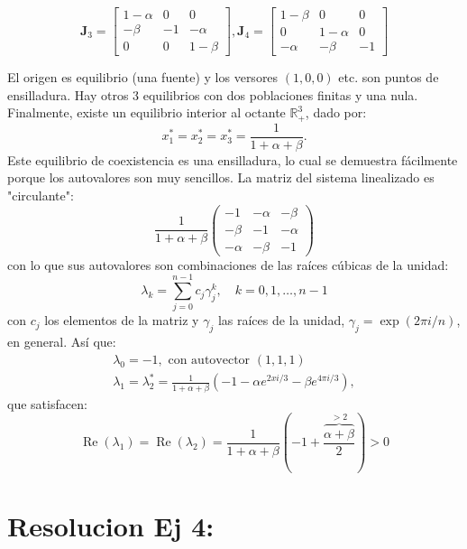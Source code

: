 \documentclass[twocolumn,aps,prl]{revtex4-1}
\begin{document}
$$
\mathbf{J}_3 = 
\begin{bmatrix}
    1 - \alpha  & 0 & 0 \\
    - \beta & -1 & - \alpha \\
    0 & 0 & 1  - \beta
\end{bmatrix}
,
\mathbf{J}_4 = 
\begin{bmatrix}
    1 - \beta  & 0 & 0 \\
    0 & 1 -\alpha  & 0 \\
    - \alpha  & -\beta & -1
\end{bmatrix}
$$



El origen es equilibrio (una fuente) y los versores $(1,0,0)$ etc. son puntos de ensilladura. Hay otros 3 equilibrios con dos poblaciones finitas y una nula. Finalmente, existe un equilibrio interior al octante $\mathbb{R}_{+}^{3}$, dado por:
$$
x_{1}^{*}=x_{2}^{*}=x_{3}^{*}=\frac{1}{1+\alpha+\beta} .
$$
Este equilibrio de coexistencia es una ensilladura, lo cual se demuestra fácilmente porque los autovalores son muy sencillos. La matriz del sistema linealizado es "circulante":
$$
\frac{1}{1+\alpha+\beta}\left(\begin{array}{ccc}
-1 & -\alpha & -\beta \\
-\beta & -1 & -\alpha \\
-\alpha & -\beta & -1
\end{array}\right)
$$
con lo que sus autovalores son combinaciones de las raíces cúbicas de la unidad:
$$
\lambda_{k}=\sum_{j=0}^{n-1} c_{j} \gamma_{j}^{k}, \quad k=0,1, \ldots, n-1
$$
con $c_{j}$ los elementos de la matriz y $\gamma_{j}$ las raíces de la unidad, $\gamma_{j}=\exp (2 \pi i / n)$, en general. Así que:
$$
\begin{array}{c}
\lambda_{0}=-1, \text { con autovector }(1,1,1) \\
\lambda_{1}=\lambda_{2}^{*}=\frac{1}{1+\alpha+\beta}\left(-1-\alpha e^{2 x i / 3}-\beta e^{4 \pi i / 3}\right),
\end{array}
$$
que satisfacen:
$$
\operatorname{Re}\left(\lambda_{1}\right)=\operatorname{Re}\left(\lambda_{2}\right)=\frac{1}{1+\alpha+\beta}\left(-1+\frac{\overbrace{\alpha+\beta}^{>2}}{2}\right)>0
$$

% 
%                             
% 

\section{Resolucion Ej 4:}
\end{document}
